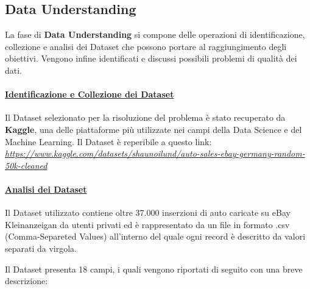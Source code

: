 \subsection{Data Understanding}
La fase di \textbf{Data Understanding} si compone delle operazioni di identificazione, collezione e analisi dei Dataset che possono portare al raggiungimento degli obiettivi. Vengono infine identificati e discussi possibili problemi di qualità dei dati.

\paragraph{\textcolor[HTML]{000099}{\underline{Identificazione e Collezione dei Dataset}}}
Il Dataset selezionato per la risoluzione del problema è stato recuperato da \textbf{Kaggle}, una delle piattaforme più utilizzate nei campi della Data Science e del Machine Learning. Il Dataset è reperibile a questo link:
\textit{\url{https://www.kaggle.com/datasets/shaunoilund/auto-sales-ebay-germany-random-50k-cleaned}} %

\paragraph{\textcolor[HTML]{000099}{\underline{Analisi dei Dataset}}}
Il Dataset utilizzato contiene oltre 37.000 inserzioni di auto caricate su eBay Kleinanzeigan da utenti privati ed è rappresentato da un file in formato .csv (Comma-Separeted Values) all'interno del quale ogni record è descritto da valori separati da virgola.

Il Dataset presenta 18 campi, i quali vengono riportati di seguito con una breve descrizione:

